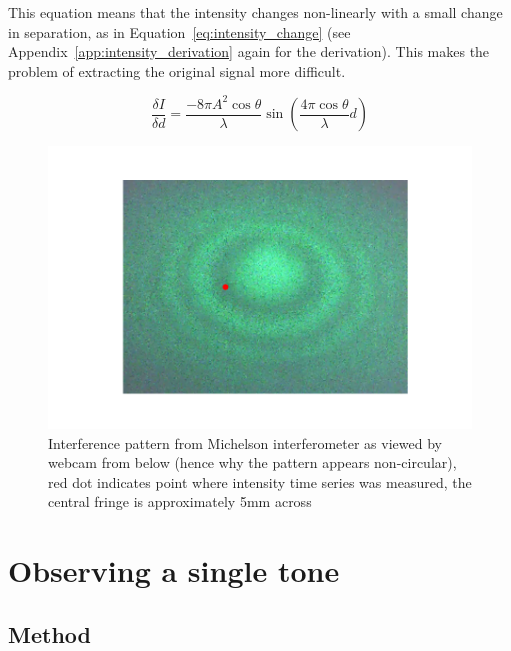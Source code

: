\documentclass[prb,preprint]{revtex4-1}
\begin{document}
This equation means that the intensity changes non-linearly with a small change in separation, as in Equation~\ref{eq:intensity_change} (see Appendix~\ref{app:intensity_derivation} again for the derivation). This makes the problem of extracting the original signal more difficult.

\begin{equation}
\label{eq:intensity_change}
	\frac{\delta I}{\delta d} = \frac{- 8 \pi A^2 \cos{\theta}}{\lambda} \sin{(\frac{4 \pi \cos{\theta}}{\lambda} d)}
\end{equation}

\begin{figure}
	\includegraphics[width=\textwidth]{figures/webcam_still0.pdf}
	\caption{Interference pattern from Michelson interferometer as viewed by webcam from below (hence why the pattern appears non-circular), red dot indicates point where intensity time series was measured, the central fringe is approximately 5mm across}
	\label{fig:interference_pattern}
\end{figure}



\section{Observing a single tone}
\label{sec:single_tone}

\subsection{Method}
\end{document}
